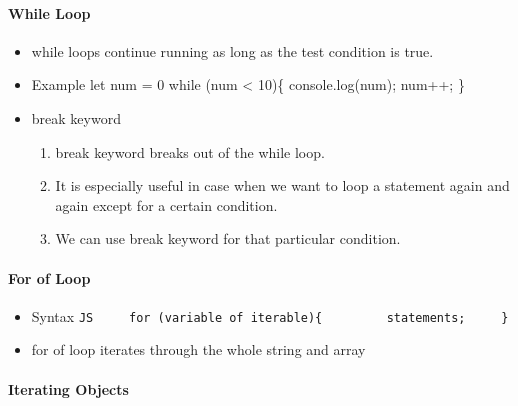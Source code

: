 \documentclass[
  paper=a4,
  ,captions=tableheading
]{scrartcl}
\providecommand{\tightlist}{%
  \setlength{\itemsep}{0pt}\setlength{\parskip}{0pt}}
\begin{document}
\hypertarget{while-loop}{%
\paragraph{While Loop}\label{while-loop}}

\begin{itemize}
\tightlist
\item
  while loops continue running as long as the test condition is true.
\item
  Example let num = 0 while (num \textless{} 10)\{ console.log(num);
  num++; \}
\item
  break keyword

  \begin{enumerate}
  \def\labelenumi{\arabic{enumi}.}
  \tightlist
  \item
    break keyword breaks out of the while loop.
  \item
    It is especially useful in case when we want to loop a statement
    again and again except for a certain condition.
  \item
    We can use break keyword for that particular condition.
  \end{enumerate}
\end{itemize}

\hypertarget{for-of-loop}{%
\paragraph{For of Loop}\label{for-of-loop}}

\begin{itemize}
\tightlist
\item
  Syntax
  \texttt{JS\ \ \ \ \ for\ (variable\ of\ iterable)\{\ \ \ \ \ \ \ \ \ statements;\ \ \ \ \ \}}
\item
  for of loop iterates through the whole string and array
\end{itemize}

\hypertarget{iterating-objects}{%
\paragraph{Iterating Objects}\label{iterating-objects}}
\end{document}

